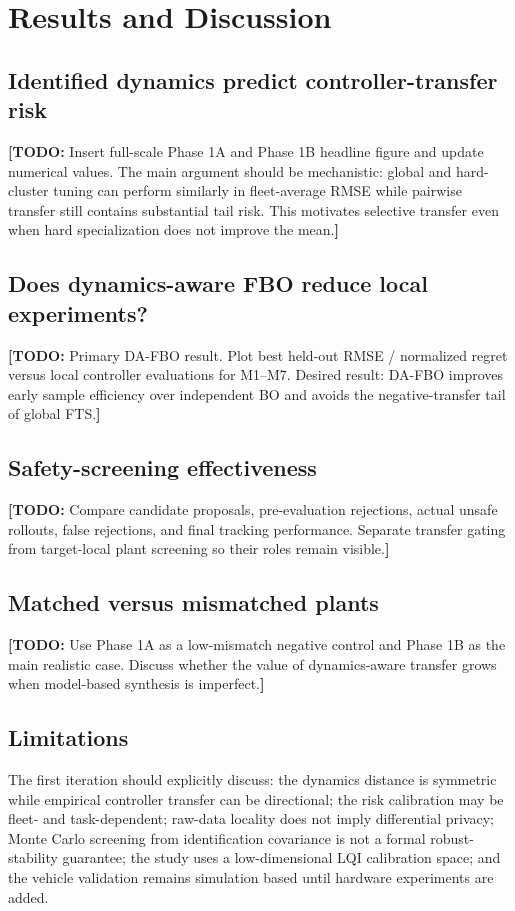 \documentclass[conference]{IEEEtran}
\newcommand{\todo}[1]{\textcolor{red!70!black}{\textbf{[TODO:} #1\textbf{]}}}
\begin{document}
\section{Results and Discussion}
\label{sec:results}
\subsection{Identified dynamics predict controller-transfer risk}
\todo{Insert full-scale Phase 1A and Phase 1B headline figure and update numerical values. The main argument should be mechanistic: global and hard-cluster tuning can perform similarly in fleet-average RMSE while pairwise transfer still contains substantial tail risk. This motivates selective transfer even when hard specialization does not improve the mean.}

\subsection{Does dynamics-aware FBO reduce local experiments?}
\todo{Primary DA-FBO result. Plot best held-out RMSE / normalized regret versus local controller evaluations for M1--M7. Desired result: DA-FBO improves early sample efficiency over independent BO and avoids the negative-transfer tail of global FTS.}

\subsection{Safety-screening effectiveness}
\todo{Compare candidate proposals, pre-evaluation rejections, actual unsafe rollouts, false rejections, and final tracking performance. Separate transfer gating from target-local plant screening so their roles remain visible.}

\subsection{Matched versus mismatched plants}
\todo{Use Phase 1A as a low-mismatch negative control and Phase 1B as the main realistic case. Discuss whether the value of dynamics-aware transfer grows when model-based synthesis is imperfect.}

\subsection{Limitations}
The first iteration should explicitly discuss: the dynamics distance is symmetric while empirical controller transfer can be directional; the risk calibration may be fleet- and task-dependent; raw-data locality does not imply differential privacy; Monte Carlo screening from identification covariance is not a formal robust-stability guarantee; the study uses a low-dimensional LQI calibration space; and the vehicle validation remains simulation based until hardware experiments are added.
\end{document}
